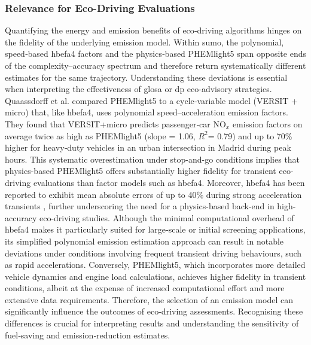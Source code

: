 \subsubsection{Relevance for Eco-Driving Evaluations}
\label{subsubsec:relevance_eco_driving}
Quantifying the energy and emission benefits of eco‐driving algorithms hinges on the fidelity of the underlying emission model. Within \ac{sumo}, the polynomial, speed‐based \ac{hbefa}4 factors and the physics‐based PHEMlight5 span opposite ends of the complexity–accuracy spectrum and therefore return systematically different estimates for the same trajectory. Understanding these deviations is essential when interpreting the effectiveness of \ac{glosa} or \ac{dp} eco‐advisory strategies. 
\mynewline
Quaassdorff et al. \cite{Quaassdorff2022} compared PHEMlight5 to a cycle‐variable model (VERSIT + micro) that, like \ac{hbefa}4, uses polynomial speed–acceleration emission factors. They found that VERSIT+micro predicts passenger‐car NO\(_x\) emission factors on average twice as high as PHEMlight5 (slope = 1.06, \(R^2\)= 0.79) and up to 70\% higher for heavy‐duty vehicles in an urban intersection in Madrid during peak hours. This systematic overestimation under stop-and-go conditions implies that physics-based PHEMlight5 offers substantially higher fidelity for transient eco-driving evaluations than factor models such as \ac{hbefa}4. Moreover, \ac{hbefa}4 has been reported to exhibit mean absolute errors of up to 40\% during strong acceleration transients \cite{Krajzewicz2002}, further underscoring the need for a physics-based back-end in high-accuracy eco-driving studies. 
\mynewline
Although the minimal computational overhead of \ac{hbefa}4 makes it particularly suited for large‐scale or initial screening applications, its simplified polynomial emission estimation approach can result in notable deviations under conditions involving frequent transient driving behaviours, such as rapid accelerations. Conversely, PHEMlight5, which incorporates more detailed vehicle dynamics and engine load calculations, achieves higher fidelity in transient conditions, albeit at the expense of increased computational effort and more extensive data requirements. Therefore, the selection of an emission model can significantly influence the outcomes of eco-driving assessments. Recognising these differences is crucial for interpreting results and understanding the sensitivity of fuel‐saving and emission‐reduction estimates.


